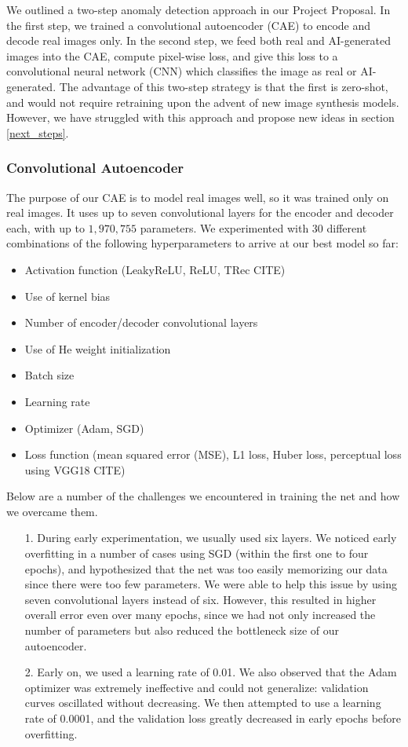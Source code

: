 \documentclass{article} %
\begin{document}
We outlined a two-step anomaly detection approach in our Project Proposal. In the first step, we trained a convolutional autoencoder (CAE) to encode and decode real images only. In the second step, we feed both real and AI-generated images into the CAE, compute pixel-wise loss, and give this loss to a convolutional neural network (CNN) which classifies the image as real or AI-generated. The advantage of this two-step strategy is that the first is zero-shot, and would not require retraining upon the advent of new image synthesis models. However, we have struggled with this approach and propose new ideas in section \ref{next_steps}.

\subsubsection{Convolutional Autoencoder}

The purpose of our CAE is to model real images well, so it was trained only on real images. It uses up to seven convolutional layers for the encoder and decoder each, with up to $1,970,755$ parameters. We experimented with 30 different combinations of the following hyperparameters to arrive at our best model so far:

\begin{itemize}
    \item Activation function (LeakyReLU, ReLU, TRec CITE)
    \item Use of kernel bias
    \item Number of encoder/decoder convolutional layers
    \item Use of He weight initialization
    \item Batch size
    \item Learning rate
    \item Optimizer (Adam, SGD)
    \item Loss function (mean squared error (MSE), L1 loss, Huber loss, perceptual loss using VGG18 CITE)
\end{itemize}

Below are a number of the challenges we encountered in training the net and how we overcame them.

\begin{itemize}
    \item[1.] During early experimentation, we usually used six layers. We noticed early overfitting in a number of cases using SGD (within the first one to four epochs), and hypothesized that the net was too easily memorizing our data since there were too few parameters. We were able to help this issue by using seven convolutional layers instead of six. However, this resulted in higher overall error even over many epochs, since we had not only increased the number of parameters but also reduced the bottleneck size of our autoencoder.
    \item[2.] Early on, we used a learning rate of 0.01. We also observed that the Adam optimizer was extremely ineffective and could not generalize: validation curves oscillated without decreasing. We then attempted to use a learning rate of 0.0001, and the validation loss greatly decreased in early epochs before overfitting.
\end{itemize}
\end{document}
